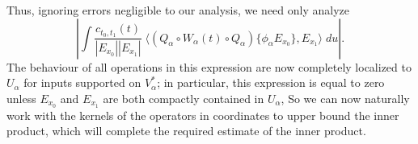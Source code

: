 Thus, ignoring errors negligible to our analysis, we need only analyze
%
\[ \left| \int \frac{c_{t_0,t_1}(t)}{|E_{x_0}| |E_{x_1}|}\; \big\langle (Q_\alpha \circ W_\alpha(t) \circ Q_\alpha) \{ \phi_\alpha E_{x_0} \}, E_{x_1} \big\rangle\; du \right|. \]
%
The behaviour of all operations in this expression are now completely localized to $U_\alpha$ for inputs supported on $V^*_\alpha$; in particular, this expression is equal to zero unless $E_{x_0}$ and $E_{x_1}$ are both compactly contained in $U_\alpha$, So we can now naturally work with the kernels of the operators in coordinates to upper bound the inner product, which will complete the required estimate of the inner product.



